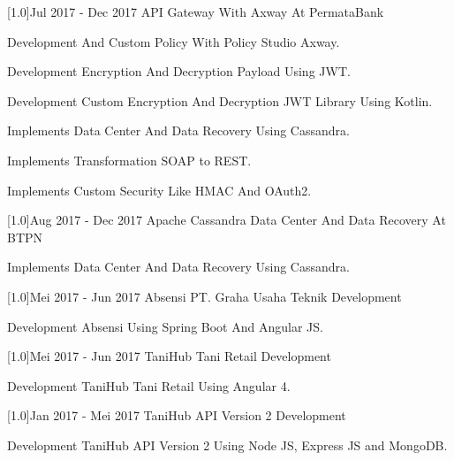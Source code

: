 \documentclass[english]{cv-style}
\begin{document}
\begin{entrylist}
\entry
{\scalebox{.6}[1.0]{Jul 2017 - Dec 2017}}
{API Gateway With Axway At PermataBank}
{}
{\vspace{-0.3cm}
  \begin{itemize}\small{
    \item Development And Custom Policy With Policy Studio Axway.
    \item Development Encryption And Decryption Payload Using JWT.
    \item Development Custom Encryption And Decryption JWT Library Using Kotlin.
    \item Implements Data Center And Data Recovery Using Cassandra.
    \item Implements Transformation SOAP to REST.
    \item Implements Custom Security Like HMAC And OAuth2.}
  \end{itemize}}
\entry
{\scalebox{.6}[1.0]{Aug 2017 - Dec 2017}}
{Apache Cassandra Data Center And Data Recovery At BTPN}
{}
{\vspace{-0.3cm}
  \begin{itemize}\small{
    \item Implements Data Center And Data Recovery Using Cassandra.}
  \end{itemize}}
\entry
{\scalebox{.6}[1.0]{Mei 2017 - Jun 2017}}
{Absensi PT. Graha Usaha Teknik Development}
{}
{\vspace{-0.3cm}
  \begin{itemize}\small{
    \item Development Absensi Using Spring Boot And Angular JS.}
  \end{itemize}}
\entry
{\scalebox{.6}[1.0]{Mei 2017 - Jun 2017}}
{TaniHub Tani Retail Development}
{}
{\vspace{-0.3cm}
  \begin{itemize}\small{
    \item Development TaniHub Tani Retail Using Angular 4.}
  \end{itemize}}
\entry
{\scalebox{.6}[1.0]{Jan 2017 - Mei 2017}}
{TaniHub API Version 2 Development}
{}
{\vspace{-0.3cm}
  \begin{itemize}\small{
    \item Development TaniHub API Version 2 Using Node JS, Express JS and MongoDB.}

\end{itemize}}
\end{entrylist}
\end{document}
